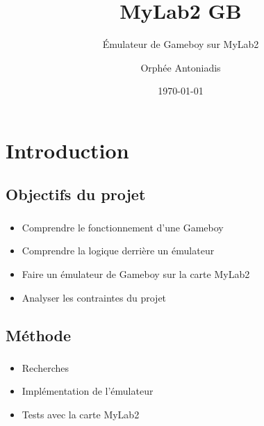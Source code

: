 \documentclass{beamer}
\begin{document}

\title{MyLab2 GB}
\subtitle{Émulateur de Gameboy sur MyLab2}
\author{Orphée Antoniadis}
\date{\today}

\begin{frame}
\titlepage
\end{frame}

\begin{frame}
	\setcounter{tocdepth}{1}
	\tableofcontents
\end{frame}


\section{Introduction}
\subsection{Objectifs du projet}
\begin{frame}
	\frametitle{\secname}
	\framesubtitle{\subsecname}
	\begin{itemize}
		\item Comprendre le fonctionnement d'une Gameboy
    \item Comprendre la logique derrière un émulateur
    \item Faire un émulateur de Gameboy sur la carte MyLab2
		\item Analyser les contraintes du projet
	\end{itemize}
\end{frame}


\subsection{Méthode}
\begin{frame}
	\frametitle{\secname}
	\framesubtitle{\subsecname}
	\begin{itemize}
		\item Recherches
		\item Implémentation de l'émulateur
    \item Tests avec la carte MyLab2
	\end{itemize}
\end{frame}
\end{document}
